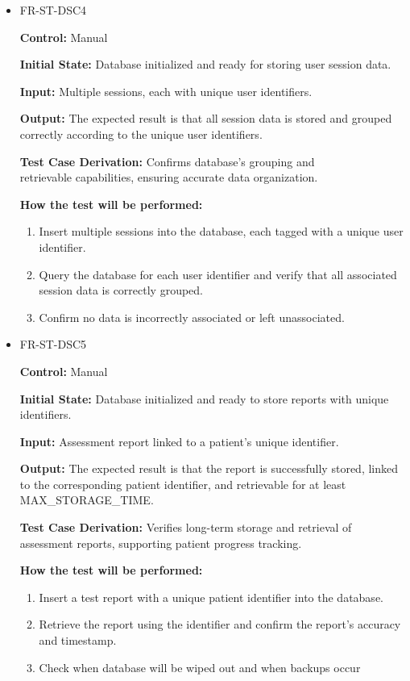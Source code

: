 \documentclass[12pt, titlepage]{article}
\begin{document}
\begin{itemize}
  \item FR-ST-DSC4
  \begin{mdframed}[linewidth=0.5mm]
      \textbf{Control:} Manual \par
      \textbf{Initial State:} Database initialized and ready for storing user session data. \par
      \textbf{Input:} Multiple sessions, each with unique user identifiers. \par
      \textbf{Output:} The expected result is that all session data is stored and grouped correctly according to the unique user identifiers. \par
      \textbf{Test Case Derivation:} Confirms database's grouping and \\retrievable capabilities, ensuring accurate data organization.\par
      \textbf{How the test will be performed:}
      \begin{enumerate}[noitemsep]
        \item Insert multiple sessions into the database, each tagged with a unique user identifier.
        \item Query the database for each user identifier and verify that all associated session data is correctly grouped.
        \item Confirm no data is incorrectly associated or left unassociated.
      \end{enumerate}
  \end{mdframed}

  \item FR-ST-DSC5
  \begin{mdframed}[linewidth=0.5mm]
      \textbf{Control:} Manual \par
      \textbf{Initial State:} Database initialized and ready to store reports with unique \\ identifiers. \par
      \textbf{Input:} Assessment report linked to a patient’s unique identifier. \par
      \textbf{Output:} The expected result is that the report is successfully stored, linked to the corresponding patient identifier, and retrievable for at least \\ MAX\_STORAGE\_TIME. \par
      \textbf{Test Case Derivation:} Verifies long-term storage and retrieval of assessment reports, supporting patient progress tracking. \par
      \textbf{How the test will be performed:}
      \begin{enumerate}[noitemsep]
        \item Insert a test report with a unique patient identifier into the database.
        \item Retrieve the report using the identifier and confirm the report’s accuracy and timestamp.
        \item Check when database will be wiped out and when backups occur
      \end{enumerate}
  \end{mdframed}

\end{itemize}
\end{document}
